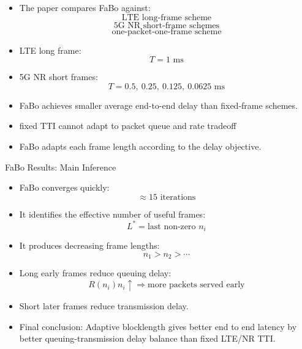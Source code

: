 \documentclass{beamer}
\begin{document}
\begin{frame}{}

\small

\begin{itemize}
    \item The paper compares FaBo against:
    \[
    \text{LTE long-frame scheme}
    \]
    \[
    \text{5G NR short-frame schemes}
    \]
    \[
    \text{one-packet-one-frame scheme}
    \]

    \item LTE long frame:
    \[
    T=1\text{ ms}
    \]

    \item 5G NR short frames:
    \[
    T=0.5,\ 0.25,\ 0.125,\ 0.0625\text{ ms}
    \]

    \item FaBo achieves smaller average end-to-end delay than fixed-frame schemes.

    \item fixed TTI cannot adapt to packet queue and rate tradeoff

    \item FaBo adapts each frame length according to the delay objective.
\end{itemize}

\end{frame}

\begin{frame}{FaBo Results: Main Inference}
\small

\begin{itemize}
    \item FaBo converges quickly:
    \[
    \approx 15 \text{ iterations}
    \]

    \item It identifies the effective number of useful frames:
    \[
    L^* = \text{last non-zero } n_i
    \]

    \item It produces decreasing frame lengths:
    \[
    n_1>n_2>\cdots
    \]

    \item Long early frames reduce queuing delay:
    \[
    R(n_i)n_i \uparrow
    \Rightarrow
    \text{more packets served early}
    \]

    \item Short later frames reduce transmission delay.

    \item Final conclusion: Adaptive blocklength gives better end to end latency by better queuing-transmission delay balance than fixed LTE/NR TTI.
\end{itemize}

\end{frame}
\end{document}
